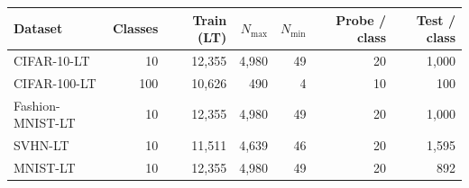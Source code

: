 \begin{tabular}{lrrrrrr}
\toprule
Dataset & Classes & Train (LT) & $N_{\max}$ & $N_{\min}$ & Probe / class & Test / class \\
\midrule
CIFAR-10-LT & 10 & 12,355 & 4,980 & 49 & 20 & 1,000 \\
CIFAR-100-LT & 100 & 10,626 & 490 & 4 & 10 & 100 \\
Fashion-MNIST-LT & 10 & 12,355 & 4,980 & 49 & 20 & 1,000 \\
SVHN-LT & 10 & 11,511 & 4,639 & 46 & 20 & 1,595 \\
MNIST-LT & 10 & 12,355 & 4,980 & 49 & 20 & 892 \\
\bottomrule
\end{tabular}

